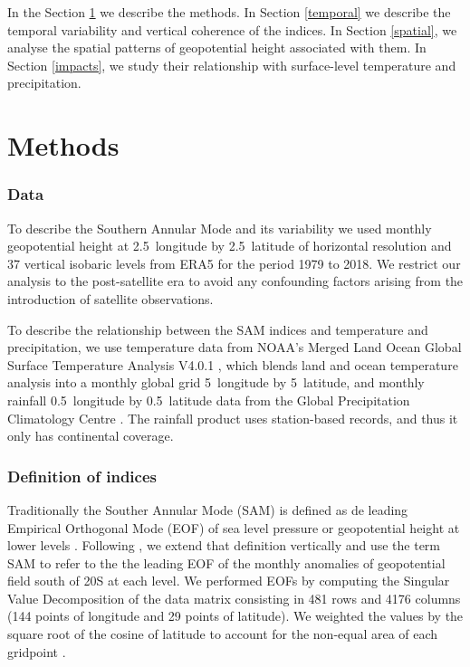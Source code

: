 \documentclass[smallextended]{svjour3}       %
\begin{document}
In the Section \ref{methods} we describe the methods. In Section \ref{temporal} we describe the temporal variability and vertical coherence of the indices. In Section \ref{spatial}, we analyse the spatial patterns of geopotential height associated with them. In Section \ref{impacts}, we study their relationship with surface-level temperature and precipitation.

\hypertarget{methods}{%
\section{Methods}\label{methods}}

\hypertarget{data}{%
\subsubsection{Data}\label{data}}

To describe the Southern Annular Mode and its variability we used monthly geopotential height at 2.5\degree~longitude by 2.5\degree~latitude of horizontal resolution and 37 vertical isobaric levels from ERA5 \citep{hersbach2020} for the period 1979 to 2018. We restrict our analysis to the post-satellite era to avoid any confounding factors arising from the introduction of satellite observations.

To describe the relationship between the SAM indices and temperature and precipitation, we use temperature data from NOAA's Merged Land Ocean Global Surface Temperature Analysis V4.0.1 \citep{smith2008, vose2012}, which blends land and ocean temperature analysis into a monthly global grid 5\degree~longitude by 5\degree~latitude, and monthly rainfall 0.5\degree~longitude by 0.5\degree~latitude data from the Global Precipitation Climatology Centre \citep{schneider2015, schneider2017}. The rainfall product uses station-based records, and thus it only has continental coverage.

\hypertarget{definition-of-indices}{%
\subsubsection{Definition of indices}\label{definition-of-indices}}

Traditionally the Souther Annular Mode (SAM) is defined as de leading Empirical Orthogonal Mode (EOF) of sea level pressure or geopotential height at lower levels \citep{ho2012}. Following \citet{baldwin2001}, we extend that definition vertically and use the term SAM to refer to the the leading EOF of the monthly anomalies of geopotential field south of 20\degree S at each level. We performed EOFs by computing the Singular Value Decomposition of the data matrix consisting in 481 rows and 4176 columns (144 points of longitude and 29 points of latitude). We weighted the values by the square root of the cosine of latitude to account for the non-equal area of each gridpoint \citep{chung1999}.
\end{document}
